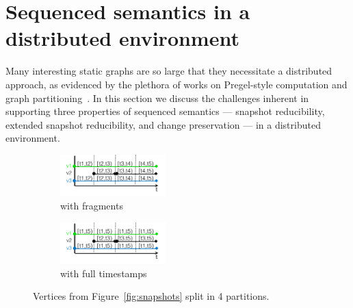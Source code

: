 \section{Sequenced semantics in a \\ distributed environment}
\label{sec:consider}


Many interesting static graphs are so large that they necessitate a
distributed approach, as evidenced by the plethora of works on
Pregel-style computation and graph partitioning~\cite{McCune2015}.  In
this section we discuss the challenges inherent in supporting three
properties of sequenced semantics --- snapshot reducibility, extended
snapshot reducibility, and change preservation --- in a distributed
environment.



\begin{figure}
\begin{subfigure}[b]{1.6in}
\includegraphics[width=1.6in]{figs/split.pdf}
\caption{with fragments}
\vspace{-0.1cm}
\label{fig:split}
\end{subfigure}
\begin{subfigure}[b]{1.6in}
\includegraphics[width=1.6in]{figs/split2.pdf}
\caption{with full timestamps}
\vspace{-0.1cm}
\label{fig:split2}
\end{subfigure}
\caption{Vertices from Figure~\ref{fig:snapshots} split in 4 partitions.}
\vspace{-0.3cm}
\end{figure}

